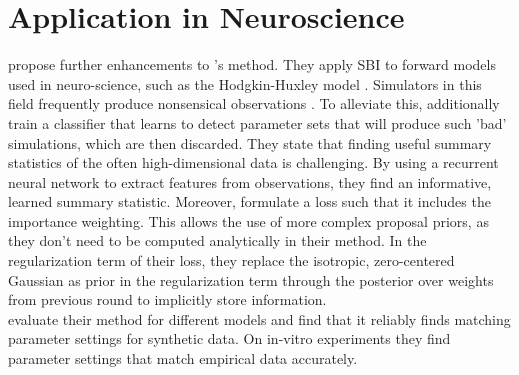 \documentclass[12pt]{article}
\begin{document}
%


\section*{Application in Neuroscience}
\citet{lueckmann2017flexible} propose further enhancements to \citet{papamakarios2016fast}'s method. They apply SBI to forward models used in neuro-science, such as the Hodgkin-Huxley model \cite{hodgkin1952quantitative}. Simulators in this field frequently produce nonsensical observations \citep{lueckmann2017flexible}. To alleviate this, \citet{lueckmann2017flexible} additionally train a classifier that learns to detect parameter sets that will produce such 'bad' simulations, which are then discarded. They state that finding useful summary statistics of the often high-dimensional data is challenging. By using a  recurrent neural network to extract features from observations, they find an informative, learned summary statistic. Moreover, \citet{lueckmann2017flexible} formulate a loss such that it includes the importance weighting. This allows the use of more complex proposal priors, as they don't need to be computed analytically in their method. In the regularization term of their loss, they replace the isotropic, zero-centered Gaussian as prior in the regularization term through the posterior over weights from previous round to implicitly store information.\\
\citet{lueckmann2017flexible} evaluate their method for different models and find that it reliably finds matching parameter settings for synthetic data. On in-vitro experiments they find parameter settings that match empirical data accurately.
\end{document}
